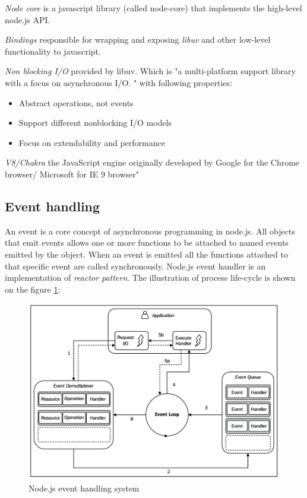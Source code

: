 \textit{Node core} is a javascript library (called node-core) that implements the high-level node.js API.

\textit{Bindings} responsible for wrapping and exposing \textit{libuv} and other low-level functionality to javascript.\cite{nodejsbook}

\textit{Non blocking I/O} provided by libuv\cite{nodejsabout}\cite{nodejsbook}. 
Which is "a multi-platform support library with a focus on asynchronous I/O. "\cite{libuv} with following properties\cite{libuvBasic}:
\begin{itemize}
\item Abstract operations, not events
\item Support different nonblocking I/O models
\item Focus on extendability and performance
\end{itemize}

\textit{V8/Chakra} the JavaScript engine originally developed by Google for the Chrome browser/ Microsoft for IE 9 browser"\cite{nodejsbook} 



\subsection{Event handling}
\label{subsec:event}
An event is a core concept of asynchronous programming in node.js. All objects that emit events allows one or more functions to be attached to named events emitted by the object. When an event is emitted all the functions attached to that specific event are called synchronously\cite{events}. Node.js  event handler is an implementation of \textit{reactor pattern}. The illustration of process life-cycle is shown on the figure \ref{fig:nodeEvent}:

\begin{figure}[ht]
  	\label{fig:nodeEvent}
    \centering
    \includegraphics[width=\textwidth]{grafiken/nodeEventHandling.png}
     \caption{Node.js event handling system \cite{nodejsbook}}
  \end{figure}

